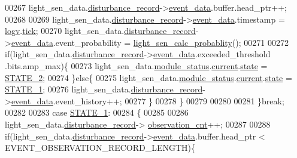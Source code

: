 \begin{DoxyCode}
00267             light\_sen\_data.\hyperlink{a00024_ac9b38e2c1d3f1013a88d33506c754152}{disturbance\_record}->\hyperlink{a00028_a8c0bda69e71ef674e60da47ad0be9ab0}{event\_data}.buffer.head\_ptr++;
00268 
00269             light\_sen\_data.\hyperlink{a00024_ac9b38e2c1d3f1013a88d33506c754152}{disturbance\_record}->\hyperlink{a00028_a8c0bda69e71ef674e60da47ad0be9ab0}{event\_data}.timestamp = 
      \hyperlink{a00021_a2e89c46668b39a17753c238950c9e1ec}{logv}.\hyperlink{a00021_a81f0ce68c2c483fb8df726cc1988d8e8}{tick};
00270             light\_sen\_data.\hyperlink{a00024_ac9b38e2c1d3f1013a88d33506c754152}{disturbance\_record}->\hyperlink{a00028_a8c0bda69e71ef674e60da47ad0be9ab0}{event\_data}.event\_probability = 
      \hyperlink{a00047_acfaee257a4ad46d9d0ffb57f97d8f35f}{light\_sen\_calc\_probablity}();
00271 
00272             \textcolor{keywordflow}{if}(light\_sen\_data.\hyperlink{a00024_ac9b38e2c1d3f1013a88d33506c754152}{disturbance\_record}->\hyperlink{a00028_a8c0bda69e71ef674e60da47ad0be9ab0}{event\_data}.exceeded\_threshold
      .bits.amp\_max)\{
00273                 light\_sen\_data.\hyperlink{a00024_a5a53c391562b059eb744ac679f3765ca}{module\_status}.\hyperlink{a00017_ab8af48cdbba92b3ae39c4470e53af944}{current}.\hyperlink{a00017_a6b8d8e916bc56265a3fd279bd26b6d1b}{state} = 
      \hyperlink{a00021_a66fa48e832a64af4d405511cecc4c752}{STATE\_2};
00274             \}\textcolor{keywordflow}{else}\{
00275               light\_sen\_data.\hyperlink{a00024_a5a53c391562b059eb744ac679f3765ca}{module\_status}.\hyperlink{a00017_ab8af48cdbba92b3ae39c4470e53af944}{current}.\hyperlink{a00017_a6b8d8e916bc56265a3fd279bd26b6d1b}{state} = 
      \hyperlink{a00021_a727351838367f27ac0adb9a13422c342}{STATE\_1};
00276               light\_sen\_data.\hyperlink{a00024_ac9b38e2c1d3f1013a88d33506c754152}{disturbance\_record}->\hyperlink{a00028_a8c0bda69e71ef674e60da47ad0be9ab0}{event\_data}.event\_history++;
00277             \}
00278             \}
00279 
00280 
00281         \}\textcolor{keywordflow}{break};
00282 
00283          \textcolor{keywordflow}{case} \hyperlink{a00021_a727351838367f27ac0adb9a13422c342}{STATE\_1}:
00284         \{
00285 
00286              light\_sen\_data.\hyperlink{a00024_ac9b38e2c1d3f1013a88d33506c754152}{disturbance\_record}->
      \hyperlink{a00028_ad5b0bac02ce266b91b2b52a1c3ea1d78}{observation\_cnt}++;
00287 
00288             \textcolor{keywordflow}{if}(light\_sen\_data.\hyperlink{a00024_ac9b38e2c1d3f1013a88d33506c754152}{disturbance\_record}->\hyperlink{a00028_a8c0bda69e71ef674e60da47ad0be9ab0}{event\_data}.buffer.head\_ptr < 
      EVENT\_OBSERVATION\_RECORD\_LENGTH)\{

\end{DoxyCode}
